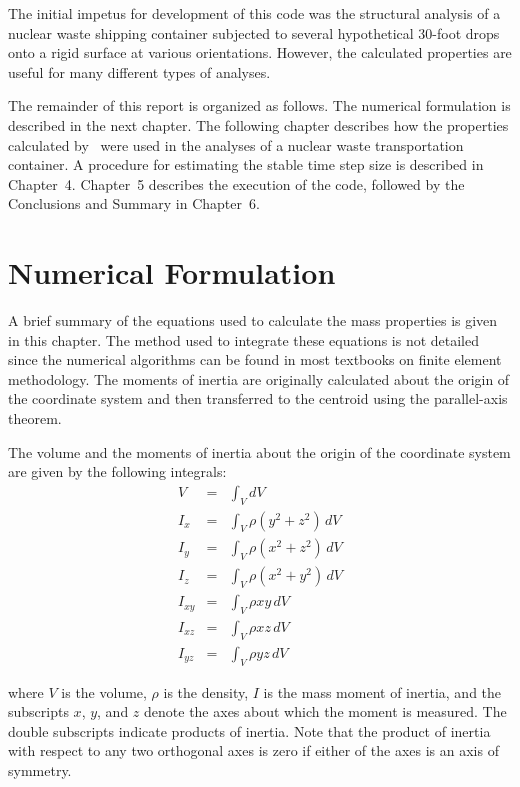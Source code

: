 The initial impetus for development of this code was the structural
analysis of a nuclear waste shipping container subjected to several
hypothetical 30-foot drops onto a rigid surface at various
orientations.  However, the calculated properties are useful for many
different types of analyses.

The remainder of this report is organized as follows.  The numerical
formulation is described in the next chapter.  The following chapter
describes how the properties calculated by \NUM\ were used in the
analyses of a nuclear waste transportation container.  A procedure for
estimating the stable time step size is described in Chapter~4.
Chapter~5 describes the execution of the code, followed by the
Conclusions and Summary in Chapter~6.


%
%

\chapter{Numerical Formulation} A brief summary of the equations used
to calculate the mass properties is given in this chapter. The method
used to integrate these equations is not detailed since the numerical
algorithms can be found in most textbooks on finite element
methodology.  The moments of inertia are originally calculated about
the origin of the coordinate system and then transferred to the
centroid using the parallel-axis theorem.

The volume and the moments of inertia about the origin of the
coordinate system are given by the following integrals:
\begin{eqnarray}
 V      &=& \int_V dV                             \\
 I_x    &=& \int_V \rho\left(y^2 + z^2\right)\,dV \\
 I_y    &=& \int_V \rho\left(x^2 + z^2\right)\,dV \\
 I_z    &=& \int_V \rho\left(x^2 + y^2\right)\,dV \\
 I_{xy} &=& \int_V \rho xy\,dV                    \\
 I_{xz} &=& \int_V \rho xz\,dV                    \\
 I_{yz} &=& \int_V \rho yz\,dV
\end{eqnarray}

where $V$ is the volume, $\rho$ is the density, $I$ is the mass moment
of inertia, and the subscripts $x$, $y$, and $z$ denote the axes about
which the moment is measured.  The double subscripts indicate products
of inertia.  Note that the product of inertia with respect to any two
orthogonal axes is zero if either of the axes is an axis of symmetry.

